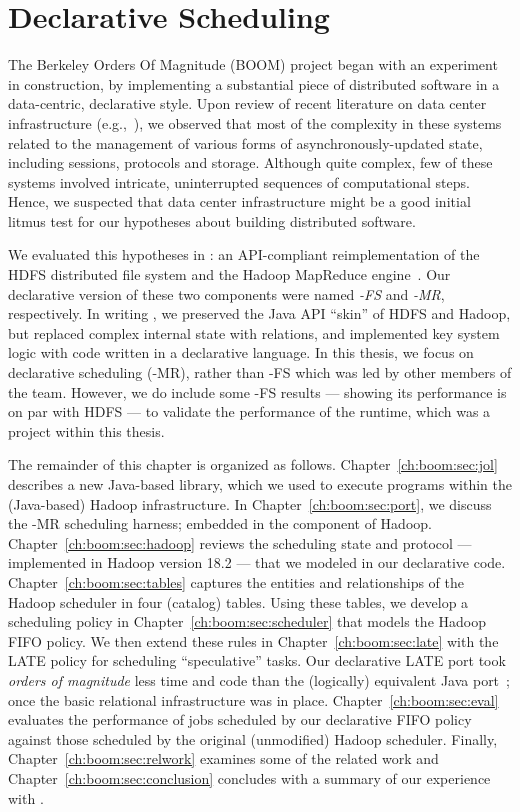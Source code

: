 \chapter[Declarative Scheduling]{Declarative Scheduling}
\label{ch:boom}

The Berkeley Orders Of Magnitude (BOOM) project began with an experiment in
construction, by implementing a substantial piece of distributed software in a
data-centric, declarative style.  Upon review of recent literature on
data center infrastructure (e.g.,~\cite{chubby,gfs-sosp,dynamo,mapreduce-osdi}),
we observed that most of the complexity in these systems related to the
management of various forms of asynchronously-updated state, including
sessions, protocols and storage.  Although quite complex, few of these systems
involved intricate, uninterrupted sequences of computational steps.  Hence, we
suspected that data center infrastructure might be a good initial litmus test
for our hypotheses about building distributed software.

We evaluated this hypotheses in {\em \BOOMA}: an API-compliant reimplementation
of the HDFS distributed file system and the Hadoop MapReduce
engine~\cite{boom}.  Our declarative version of these two components were named
{\em \BOOM-FS} and {\em \BOOM-MR}, respectively.  In writing \BOOMA, we
preserved the Java API ``skin'' of HDFS and Hadoop, but replaced complex
internal state with relations, and implemented key system logic with code
written in a declarative language.  In this thesis, we focus on declarative
scheduling (\BOOM-MR), rather than \BOOM-FS which was led by other members of
the \BOOMA team.  However, we do include some \BOOM-FS results --- showing its
performance is on par with HDFS --- to validate the performance of the \JOL
runtime, which was a project within this thesis.

The remainder of this chapter is organized as follows.
Chapter~\ref{ch:boom:sec:jol} describes a new Java-based \OVERLOG library,
which we used to execute \OVERLOG programs within the (Java-based) Hadoop
infrastructure.  In Chapter~\ref{ch:boom:sec:port}, we discuss the \BOOM-MR
scheduling harness; embedded in the \JT component of Hadoop.
Chapter~\ref{ch:boom:sec:hadoop} reviews the scheduling state and
protocol --- implemented in Hadoop version 18.2 --- that we modeled in our
declarative code.  Chapter~\ref{ch:boom:sec:tables} captures the entities and
relationships of the Hadoop scheduler in four (catalog) tables.  Using these
tables, we develop a scheduling policy in Chapter~\ref{ch:boom:sec:scheduler}
that models the Hadoop FIFO policy.  We then extend these rules in
Chapter~\ref{ch:boom:sec:late} with the LATE policy for scheduling
``speculative'' tasks.  Our declarative LATE port took {\em orders of
magnitude} less time and code than the (logically) equivalent Java
port~\cite{jira-2141}; once the basic relational infrastructure was in place.
Chapter~\ref{ch:boom:sec:eval} evaluates the performance of jobs scheduled by
our declarative FIFO policy against those scheduled by the original
(unmodified) Hadoop scheduler.  Finally, Chapter~\ref{ch:boom:sec:relwork}
examines some of the related work and Chapter~\ref{ch:boom:sec:conclusion}
concludes with a summary of our experience with \BOOMA.

